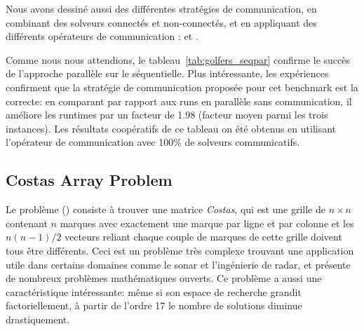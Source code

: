 \documentclass{jfpc-preprint}
\begin{document}
Nous avons dessiné aussi des différentes stratégies de communication, en combinant des solveurs connectés et non-connectés, et en appliquant des différents opérateurs de communication : \oneTone{} et \oneTn.

\begin{table}[t]
\centering
\renewcommand{\arraystretch}{1}
\caption{Résultats pour \SGP}
\label{tab:golfers_seqpar}
\end{table}

Comme nous nous attendions, le tableau~\ref{tab:golfers_seqpar} confirme le succès de l'approche parallèle sur le séquentielle. Plus intéressante, les expériences confirment que la stratégie de communication proposée pour cet benchmark est la correcte: en comparant par rapport aux runs en parallèle sans communication, il améliore les runtimes par un facteur de 1.98 (facteur moyen parmi les trois instances). Les résultats coopératifs de ce tableau on été obtenus en utilisant l'opérateur de communication \oneTone{} avec 100\% de solveurs communicatifs. 


\subsection{Costas Array Problem}

Le problème \carr{} (\CARRP) consiste à trouver une matrice {\it Costas}, qui est une grille de $n \times n$ contenant $n$ marques avec exactement une marque par ligne et par colonne et les $n(n-1)/2 $ vecteurs reliant chaque couple de marques de cette grille doivent tous être différents. Ceci est un problème très complexe trouvant une application utile dans certains domaines comme le sonar et l'ingénierie de radar, et présente de nombreux problèmes mathématiques ouverts. Ce problème a aussi une caractéristique intéressante: même si son espace de recherche grandit factoriellement, à partir de l'ordre 17 le nombre de solutions diminue drastiquement.
\end{document}
